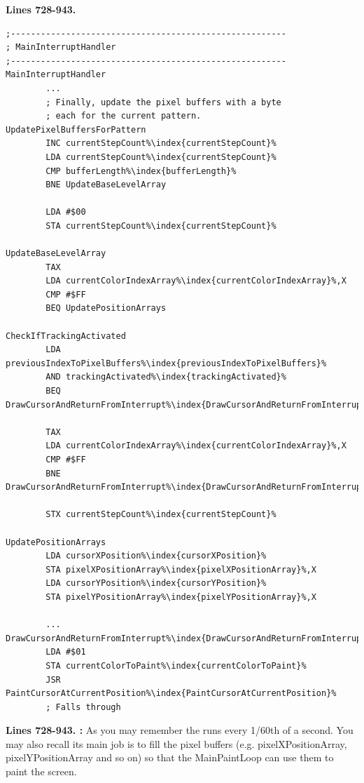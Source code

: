 \clearpage
\textbf{Lines 728-943. } 
\begin{lstlisting}[escapechar=\%]
;-------------------------------------------------------
; MainInterruptHandler
;-------------------------------------------------------
MainInterruptHandler
        ...
        ; Finally, update the pixel buffers with a byte
        ; each for the current pattern.        
UpdatePixelBuffersForPattern    
        INC currentStepCount%\index{currentStepCount}%
        LDA currentStepCount%\index{currentStepCount}%
        CMP bufferLength%\index{bufferLength}%
        BNE UpdateBaseLevelArray

        LDA #$00
        STA currentStepCount%\index{currentStepCount}%

UpdateBaseLevelArray   
        TAX 
        LDA currentColorIndexArray%\index{currentColorIndexArray}%,X
        CMP #$FF
        BEQ UpdatePositionArrays

CheckIfTrackingActivated
        LDA previousIndexToPixelBuffers%\index{previousIndexToPixelBuffers}%
        AND trackingActivated%\index{trackingActivated}%
        BEQ DrawCursorAndReturnFromInterrupt%\index{DrawCursorAndReturnFromInterrupt}%

        TAX 
        LDA currentColorIndexArray%\index{currentColorIndexArray}%,X
        CMP #$FF
        BNE DrawCursorAndReturnFromInterrupt%\index{DrawCursorAndReturnFromInterrupt}%

        STX currentStepCount%\index{currentStepCount}%

UpdatePositionArrays   
        LDA cursorXPosition%\index{cursorXPosition}%
        STA pixelXPositionArray%\index{pixelXPositionArray}%,X
        LDA cursorYPosition%\index{cursorYPosition}%
        STA pixelYPositionArray%\index{pixelYPositionArray}%,X

        ...
DrawCursorAndReturnFromInterrupt%\index{DrawCursorAndReturnFromInterrupt}%    
        LDA #$01
        STA currentColorToPaint%\index{currentColorToPaint}%
        JSR PaintCursorAtCurrentPosition%\index{PaintCursorAtCurrentPosition}%
        ; Falls through
\end{lstlisting}
\clearpage

\textbf{Lines 728-943. :} 
As you may remember the  runs every 1/60th of a
second.  You may also recall its main job is to fill the pixel buffers (e.g.
pixelXPositionArray, pixelYPositionArray and so on) so that the MainPaintLoop
can use them to paint the screen. 

